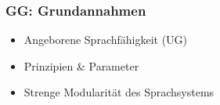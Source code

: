 

\begin{frame}
\frametitle{GG: Grundannahmen}

\begin{itemize}
	\item Angeborene Sprachfähigkeit (UG)
	\item Prinzipien \& Parameter
	\item Strenge Modularität des Sprachsystems 
\end{itemize}

\end{frame}


%
%


